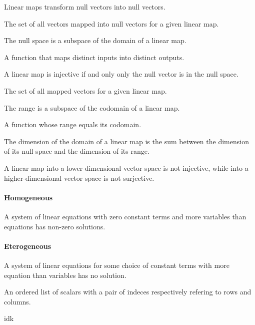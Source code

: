 \begin{multicols}{3}
  Linear maps transform null vectors into null vectors.

  The set of all vectors mapped into null vectors for a given linear map.

  The null space is a subspace of the domain of a linear map.

  A function that maps distinct inputs into distinct outputs.

  A linear map is injective if and only only the null vector is in the null space.

  The set of all mapped vectors for a given linear map.

  The range is a subspace of the codomain of a linear map.

  A function whose range equals its codomain.

  The dimension of the domain of a linear map is the sum between the dimension of its null space and the dimension of its range.

  A linear map into a lower-dimensional vector space is not injective, while into a higher-dimensional vector space is not surjective.

  \paragraph{\textbf{Homogeneous}}
  A system of linear equations with zero constant terms and more variables than equations has non-zero solutions.

  \paragraph{\textbf{Eterogeneous}}
  A system of linear equations for some choice of constant terms with more equation than variables has no solution.

  An ordered list of scalars with a pair of indeces respectively refering to rows and columns.

  idk




\end{multicols}
